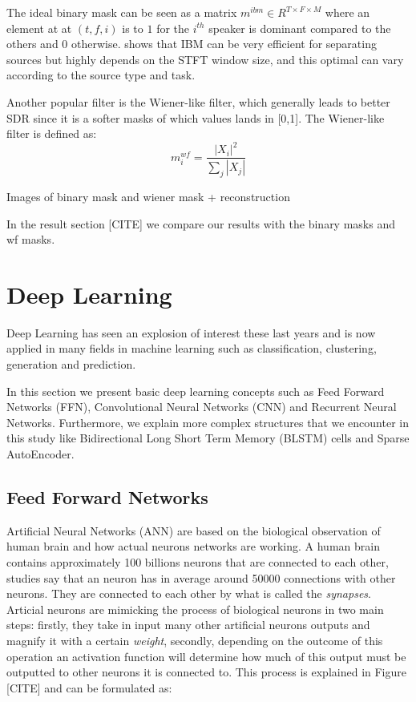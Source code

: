 \documentclass[master,final,11pt]{iscs-thesis}
\begin{document}
The ideal binary mask can be seen as a matrix $m^{ibm} \in R^{T\times F \times M}$ where an element at at $(t,f,i)$ is to $1$ for the $i^{th}$ speaker is dominant compared to the others and $0$ otherwise. \cite{IBM} shows that IBM can be very efficient for separating sources but highly depends on the STFT window size, and this optimal can vary according to the source type and task.

Another popular filter is the Wiener-like filter, which generally leads to better SDR since it is a softer masks of which values lands in [0,1]. The Wiener-like filter is defined as:
\[
m^{wf}_i = \frac{|X_i|^2}{\sum_j{|X_j|}} 
\]

Images of binary mask and wiener mask + reconstruction

In the result section [CITE] we compare our results with the binary masks and wf masks.

\section{Deep Learning}

Deep Learning \cite{DL, DLBOOK} has seen an explosion of interest these last years and is now applied in many fields in machine learning such as classification, clustering, generation and prediction.

In this section we present basic deep learning concepts such as Feed Forward Networks (FFN), Convolutional Neural Networks (CNN) and Recurrent Neural Networks. Furthermore, we explain more complex structures that we encounter in this study like Bidirectional Long Short Term Memory (BLSTM) cells and Sparse AutoEncoder.

\subsection{Feed Forward Networks}

Artificial Neural Networks (ANN) are based on the biological observation of human brain and how actual neurons networks are working. A human brain contains approximately 100 billions neurons that are connected to each other, studies say that an neuron has in average around 50000 connections with other neurons. They are connected to each other by what is called the \textit{synapses}.
Articial neurons are mimicking the process of biological neurons in two main steps: firstly, they take in input many other artificial neurons outputs and magnify it with a certain \textit{weight}, secondly, depending on the outcome of this operation an activation function will determine how much of this output must be outputted to other neurons it is connected to. This process is explained in Figure [CITE] and can be formulated as:
\end{document}

